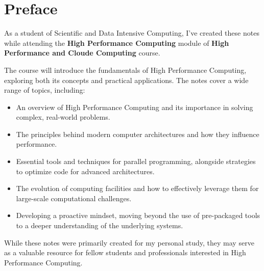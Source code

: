 \chapter*{Preface}

As a student of Scientific and Data Intensive Computing, I've created these notes while attending the \textbf{High Performance Computing} module of \textbf{High Performance and Cloude Computing} course.

The course will introduce the fundamentals of High Performance Computing, exploring both its concepts and practical applications. The notes cover a wide range of topics, including:

\begin{itemize}
    \item An overview of High Performance Computing and its importance in solving complex, real-world problems.
    \item The principles behind modern computer architectures and how they influence performance.
    \item Essential tools and techniques for parallel programming, alongside strategies to optimize code for advanced architectures.
    \item The evolution of computing facilities and how to effectively leverage them for large-scale computational challenges.
    \item Developing a proactive mindset, moving beyond the use of pre-packaged tools to a deeper understanding of the underlying systems.
\end{itemize}
    
While these notes were primarily created for my personal study, they may serve as a valuable resource for fellow students and professionals interested in High Performance Computing.